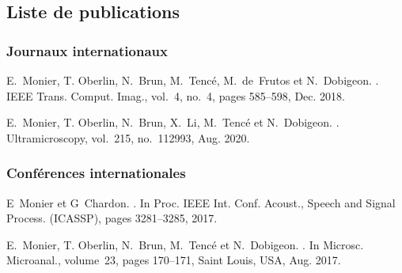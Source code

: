 \begin{fullwidth}
    \chapter*{Liste de publications}\label{ch-liste-publis}
    
    \subsection*{Journaux internationaux}
    

        E.~Monier, T. Oberlin, N.~Brun, M.~Tenc\'e, M.~de~Frutos et N.~Dobigeon.
        .
        \newblock IEEE Trans. Comput. Imag., vol.~4, no.~4, pages 585--598, Dec. 2018.

        E.~Monier, T. Oberlin, N.~Brun, X.~Li, M.~Tenc\'e et N.~Dobigeon.
        .
        \newblock Ultramicroscopy, vol.~215, no.~112993, Aug. 2020.


    \subsection*{Conférences internationales}
    

        E~Monier et G~Chardon.
        .
        \newblock In Proc. IEEE Int. Conf. Acoust., Speech and Signal Process.
          (ICASSP), pages 3281--3285, 2017.

        E.~Monier, T. Oberlin, N.~Brun, M.~Tenc\'e et N.~Dobigeon.
        .
        \newblock In Microsc. Microanal., volume~23, pages 170--171, Saint Louis, USA,
          Aug. 2017.


\end{fullwidth}

